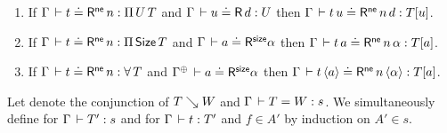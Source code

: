 \documentclass[acmlarge,review,anonymous]{acmart}\settopmatter{printfolios=true}
\begin{document}
\begin{lemma}
\label{lem:rclosne}
\bla
\begin{enumerate}
\item If\/ $\Gamma \,\vdash t \doteq \mathsf{R}^{\mathsf{ne}}\, n : \Pi\,U\, T$ and $\Gamma \,\vdash u \doteq \mathsf{R}\, d : U$ then $\Gamma \,\vdash t\,u \doteq \mathsf{R}^{\mathsf{ne}}\, n\,d : T[u]$.
\item If\/ $\Gamma \,\vdash t \doteq \mathsf{R}^{\mathsf{ne}}\, n : \Pi\,\mathsf{Size}\, T$ and $\Gamma \,\vdash a \doteq \mathsf{R}^{\mathsf{size}} \alpha$ then $\Gamma \,\vdash t\,a \doteq \mathsf{R}^{\mathsf{ne}}\, n\,\alpha : T[a]$.
\item If\/ $\Gamma \,\vdash t \doteq \mathsf{R}^{\mathsf{ne}}\, n : \forall\, T$ and $\RSIZE {\resurrect\Gamma} a \alpha$ then $\Gamma \,\vdash t\,\langle a\rangle \doteq \mathsf{R}^{\mathsf{ne}}\, n\,\langle\alpha\rangle : T[a]$.
\end{enumerate}
\end{lemma}

Let  denote the conjunction of $T \searrow W$ and $\Gamma \,\vdash T = W : s$.
We simultaneously define
 for $\Gamma \,\vdash T' : s$
and  for $\Gamma \,\vdash t : T'$ and $f \in A'$
by induction on ${A'} \in s$.
\end{document}
